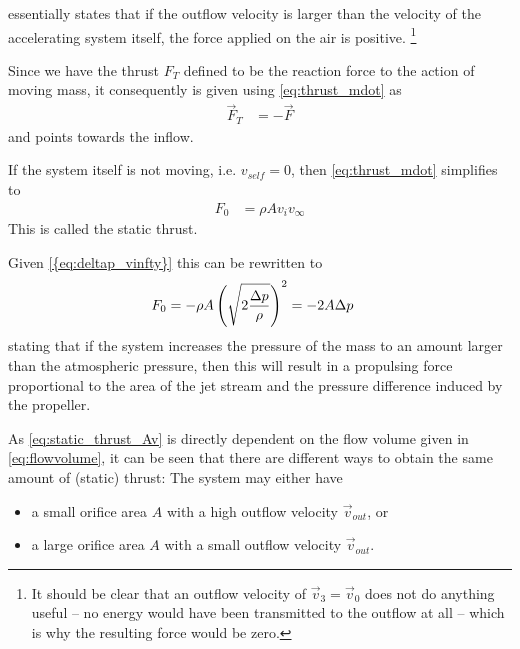  essentially states that if the outflow velocity is larger than the velocity
of the accelerating system itself, the force applied on the air is positive.%
\footnote{It should be clear that an outflow velocity of $\vec{v}_3 = \vec{v}_0$ does not do anything useful -- no energy would have been transmitted to the outflow at all -- 
which is why the resulting force would be zero.}


Since we have the thrust $F_T$ defined to be the reaction force to the action of moving mass, it consequently is given using \cref{eq:thrust_mdot} as
%
\begin{align}
\vec{F}_T &= -\vec{F} \label{eq:thrust}
\end{align}
%
and points towards the inflow.

If the system itself is not moving, i.e. $v_{self} = 0$, then \cref{eq:thrust_mdot} simplifies to
%
\begin{align}
F_{0} &= \rho A v_i v_\infty \label{eq:static_thrust_Av}
\end{align}
%
This is called the static thrust. %


Given \cref{{eq:deltap_vinfty}} this can be rewritten to
%
\begin{align}
F_{0} 
                 &= -\rho A \left(\sqrt{2\frac{\Delta p}{\rho}}\right)^2 
			  	  = -2A \Delta p
\end{align}
%
stating that if the system increases the pressure of the mass to an amount
larger than the atmospheric pressure, then this will result in a propulsing
force proportional to the area of the jet stream and the pressure difference
induced by the propeller.

As \cref{eq:static_thrust_Av} is directly dependent on
the flow volume given in \cref{eq:flowvolume}, it can be seen that there are
different ways to obtain the same amount of (static) thrust: The system may either have

\begin{itemize}
	\item a small orifice area $A$ with a high outflow velocity $\vec{v}_{out}$, or
	\item a large orifice area $A$ with a small outflow velocity $\vec{v}_{out}$.
\end{itemize}


